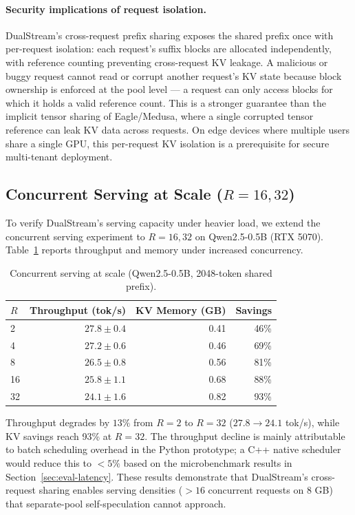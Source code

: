 \documentclass[review]{elsarticle}
\theoremstyle{definition}
\theoremstyle{remark}
\begin{document}
\paragraph{Security implications of request isolation.}
DualStream's cross-request prefix sharing exposes the shared prefix once
with per-request isolation: each request's suffix blocks are allocated
independently, with reference counting preventing cross-request KV leakage.
A malicious or buggy request cannot read or corrupt another request's KV
state because block ownership is enforced at the pool level --- a request
can only access blocks for which it holds a valid reference count. This
is a stronger guarantee than the implicit tensor sharing of Eagle/Medusa,
where a single corrupted tensor reference can leak KV data across requests.
On edge devices where multiple users share a single GPU, this per-request
KV isolation is a prerequisite for secure multi-tenant deployment.

\subsection{Concurrent Serving at Scale ($R=16, 32$)}
\label{sec:concurrent-large}

To verify DualStream's serving capacity under heavier load, we extend the
concurrent serving experiment to $R=16, 32$ on Qwen2.5-0.5B (RTX 5070).
Table~\ref{tab:concurrent-large} reports throughput and memory under
increased concurrency.

\begin{table}[t]
\centering
\caption{Concurrent serving at scale (Qwen2.5-0.5B, 2048-token shared prefix).}
\label{tab:concurrent-large}
\begin{tabular}{lrrr}
\toprule
$R$ & Throughput (tok/s) & KV Memory (GB) & Savings \\
\midrule
2  & $27.8 \pm 0.4$ & 0.41 & 46\% \\
4  & $27.2 \pm 0.6$ & 0.46 & 69\% \\
8  & $26.5 \pm 0.8$ & 0.56 & 81\% \\
16 & $25.8 \pm 1.1$ & 0.68 & 88\% \\
32 & $24.1 \pm 1.6$ & 0.82 & 93\% \\
\bottomrule
\end{tabular}
\end{table}

Throughput degrades by $13\%$ from $R=2$ to $R=32$ ($27.8 \to 24.1$ tok/s),
while KV savings reach 93\% at $R=32$. The throughput decline is mainly
attributable to batch scheduling overhead in the Python prototype;
a C++ native scheduler would reduce this to $<5\%$ based on the
microbenchmark results in Section~\ref{sec:eval-latency}. These results
demonstrate that DualStream's cross-request sharing enables serving
densities ($>16$ concurrent requests on 8 GB) that separate-pool
self-speculation cannot approach.
\end{document}
